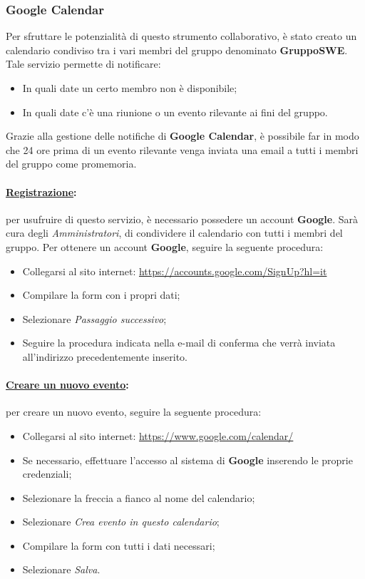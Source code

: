 \subsubsection{Google Calendar}
\label{googlecalendar}
Per sfruttare le potenzialità di questo strumento collaborativo, è stato creato un calendario condiviso tra i vari membri del gruppo denominato \textbf{GruppoSWE}. Tale servizio permette di notificare:
\begin{itemize}
\item In quali date un certo membro non è disponibile;
\item In quali date c'è una riunione o un evento rilevante ai fini del gruppo.
\end{itemize}
Grazie alla gestione delle notifiche di \textbf{Google Calendar}\g{}, è possibile far in modo che 24 ore prima di un evento rilevante venga inviata una email a tutti i membri del gruppo come promemoria.

\paragraph{\underline{Registrazione}:} per usufruire di questo servizio, è necessario possedere un account \textbf{Google}. Sarà cura degli \textit{Amministratori}, di condividere il calendario con tutti i membri del gruppo. Per ottenere un account \textbf{Google}, seguire la seguente procedura:
\begin{itemize}
\item Collegarsi al sito internet: \url{https://accounts.google.com/SignUp?hl=it}
\item Compilare la form con i propri dati;
\item Selezionare \textit{Passaggio successivo};
\item Seguire la procedura indicata nella e-mail di conferma che verrà inviata all'indirizzo precedentemente inserito.
\end{itemize}

\paragraph{\underline{Creare un nuovo evento}:} per creare un nuovo evento, seguire la seguente procedura:
\begin{itemize}
\item Collegarsi al sito internet: \url{https://www.google.com/calendar/}
\item Se necessario, effettuare l'accesso al sistema di \textbf{Google} inserendo le proprie credenziali;
\item Selezionare la freccia a fianco al nome del calendario;
\item Selezionare \textit{Crea evento in questo calendario};
\item Compilare la form con tutti i dati necessari;
\item Selezionare \textit{Salva}.
\end{itemize}

